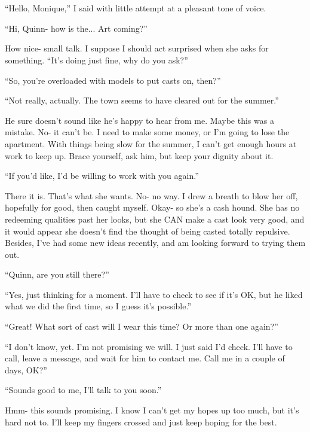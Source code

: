 \chapter{}
``Hello, Monique,'' I said with little attempt at a pleasant tone of voice.

``Hi, Quinn- how is the... Art coming?''

How nice- small talk. I suppose I should act surprised when she asks for something. ``It's
doing just fine, why do you ask?''

``So, you're overloaded with models to put casts on, then?''

``Not really, actually. The town seems to have cleared out for the summer.''

\begin{thought}
He sure doesn't sound like he's happy to hear from me. Maybe this was a mistake. No- it
can't be. I need to make some money, or I'm going to lose the apartment. With things being slow
for the summer, I can't get enough hours at work to keep up. Brace yourself, ask him, but keep
your dignity about it.
\end{thought}

``If you'd like, I'd be willing to work with you again.''

There it is. That's what she wants. No- no way. I drew a breath to blow her off, hopefully
for good, then caught myself. Okay- so she's a cash hound. She has no redeeming qualities past
her looks, but she CAN make a cast look very good, and it would appear she doesn't find the
thought of being casted totally repulsive. Besides, I've had some new ideas recently, and am
looking forward to trying them out.

``Quinn, are you still there?''

``Yes, just thinking for a moment. I'll have to check to see if it's OK, but he liked what we
did the first time, so I guess it's possible.''

``Great! What sort of cast will I wear this time? Or more than one again?''

``I don't know, yet. I'm not promising we will. I just said I'd check. I'll have to call,
leave a message, and wait for him to contact me. Call me in a couple of days, OK?''

``Sounds good to me, I'll talk to you soon.''

\begin{thought}
Hmm- this sounds promising. I know I can't get my hopes up too much, but it's hard not to.
I'll keep my fingers crossed and just keep hoping for the best.
\end{thought}

